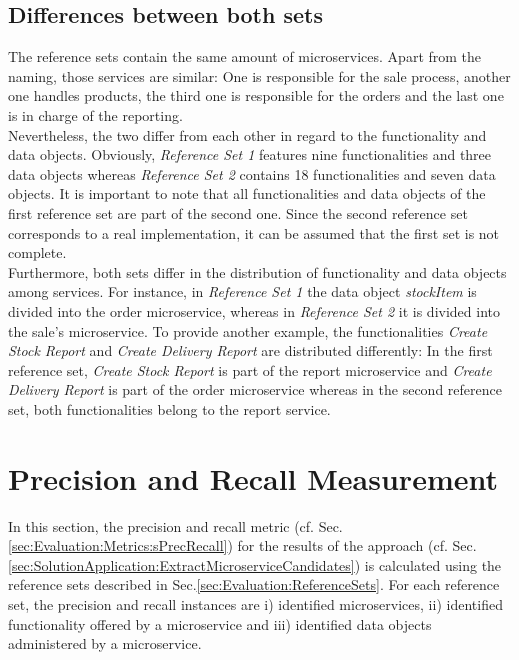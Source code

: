 \subsection{Differences between both sets}
The reference sets contain the same amount of microservices. Apart from the naming, those services are similar: One is responsible for the sale process, another one handles products, the third one is responsible for the orders and the last one is in charge of the reporting. \\
Nevertheless, the two differ from each other in regard to the functionality and data objects. Obviously, \textit{Reference Set 1} features nine functionalities and three data objects whereas \textit{Reference Set 2} contains 18 functionalities and seven data objects. It is important to note that all functionalities and data objects of the first reference set are part of the second one. Since the second reference set corresponds to a real implementation, it can be assumed that the first set is not complete. \\
Furthermore, both sets differ in the distribution of functionality and data objects among services. For instance, in \textit{Reference Set 1} the data object \textit{stockItem} is divided into the order microservice, whereas in \textit{Reference Set 2} it is divided into the sale's microservice. To provide another example, the functionalities \textit{Create Stock Report} and \textit{Create Delivery Report} are distributed differently: In the first reference set, \textit{Create Stock Report} is part of the report microservice and \textit{Create Delivery Report} is part of the order microservice whereas in the second reference set, both functionalities belong to the report service. \\




\section{Precision and Recall Measurement}
\label{sec:Evalutation:PrecisionAndRecallMeasurement}
In this section, the precision and recall metric (cf. Sec.\ref{sec:Evaluation:Metrics:sPrecRecall}) for the results of the approach (cf. Sec.\ref{sec:SolutionApplication:ExtractMicroserviceCandidates}) is calculated using the reference sets described in Sec.\ref{sec:Evaluation:ReferenceSets}. 
For each reference set, the precision and recall instances are i) identified microservices, ii) identified functionality offered by a microservice and iii) identified data objects administered by a microservice. 

